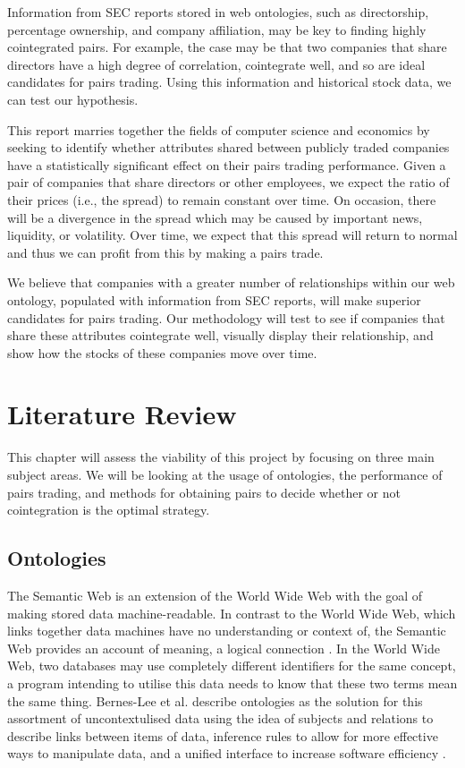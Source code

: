 \documentclass{UoYCSproject}
\begin{document}
Information from SEC reports stored in web ontologies, such as directorship, percentage ownership, and company affiliation, may be key to finding highly cointegrated pairs. For example, the case may be that two companies that share directors have a high degree of correlation, cointegrate well, and so are ideal candidates for pairs trading. Using this information and historical stock data, we can test our hypothesis.

This report marries together the fields of computer science and economics by seeking to identify whether attributes shared between publicly traded companies have a statistically significant effect on their pairs trading performance. Given a pair of companies that share directors or other employees, we expect the ratio of their prices (i.e., the spread) to remain constant over time. On occasion, there will be a divergence in the spread which may be caused by important news, liquidity, or volatility. Over time, we expect that this spread will return to normal and thus we can profit from this by making a pairs trade.

We believe that companies with a greater number of relationships within our web ontology, populated with information from SEC reports, will make superior candidates for pairs trading. Our methodology will test to see if companies that share these attributes cointegrate well, visually display their relationship, and show how the stocks of these companies move over time.

\chapter{Literature Review}
\label{cha:Literature Review}

This chapter will assess the viability of this project by focusing on three main subject areas. We will be looking at the usage of ontologies, the performance of pairs trading, and methods for obtaining pairs to decide whether or not cointegration is the optimal strategy.

\section{Ontologies}

The Semantic Web is an extension of the World Wide Web with the goal of making stored data machine-readable. In contrast to the World Wide Web, which links together data machines have no understanding or context of, the Semantic Web provides an account of meaning, a logical connection \parencite{semanticrevisited}. In the World Wide Web, two databases may use completely different identifiers for the same concept, a program intending to utilise this data needs to know that these two terms mean the same thing. Bernes-Lee et al. describe ontologies as the solution for this assortment of uncontextulised data using the idea of subjects and relations to describe links between items of data, inference rules to allow for more effective ways to manipulate data, and a unified interface to increase software efficiency \parencite{semanticontologies}.
\end{document}
